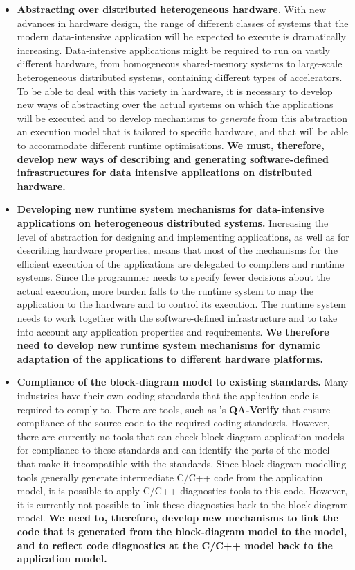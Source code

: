 \documentclass[a4paper,11pt]{article}
\begin{document}
\begin{itemize}
\item \textbf{Abstracting over distributed heterogeneous hardware.} With
  new advances in hardware design, the range of different classes of
  systems that the modern data-intensive application will be expected to
  execute is dramatically increasing. Data-intensive applications might
  be required to run on vastly different hardware, from   homogeneous shared-memory systems
  to large-scale  heterogeneous distributed systems, containing different
  types of accelerators. To be able to deal with this variety in
  hardware, it is necessary to develop new ways of abstracting over the
  actual systems on which the applications will be executed and to
  develop mechanisms to \emph{generate} from this abstraction an
  execution model that is tailored to specific hardware, and that will be able to
  accommodate different runtime optimisations. \textbf{We must,
    therefore, develop new ways of describing and generating
    software-defined infrastructures for data intensive applications on
    distributed hardware.}

\item \textbf{Developing new runtime system mechanisms for data-intensive
  applications on heterogeneous distributed systems.} Increasing the
  level of abstraction for designing and implementing applications, as
  well as for describing hardware properties, means that most of the
  mechanisms for the efficient execution of the applications are delegated
  to compilers and runtime systems. Since the programmer needs to specify
  fewer decisions about the actual execution, more burden falls to the
  runtime system to map the application to the hardware and to control its
  execution. The runtime system needs to work together with the
  software-defined infrastructure and to take into account any
  application properties and requirements. \textbf{We therefore need to
    develop new runtime system mechanisms for dynamic adaptation of the
    applications to different hardware platforms.}

\item \textbf{Compliance of the block-diagram model to existing
  standards.} Many industries have their own coding standards that the
  application code is required to comply to. There are tools,
  such as \PRLshort{}'s \textbf{QA-Verify} that ensure
  compliance of the source code to the required coding standards. However, there
  are currently no tools that can check block-diagram application
  models for compliance to these standards and can identify the parts of the
  model that make it incompatible with the standards. Since
  block-diagram modelling tools generally generate intermediate C/C++ code from
  the application model, it is possible to apply C/C++ diagnostics
  tools to this code. However, it is currently not possible to link these
  diagnostics back to the block-diagram model. \textbf{We need to,
    therefore, develop new mechanisms to link the code that is generated from the
    block-diagram model to the model, and to reflect code diagnostics
    at the C/C++ model back to the application model.}


\end{itemize}
\end{document}
